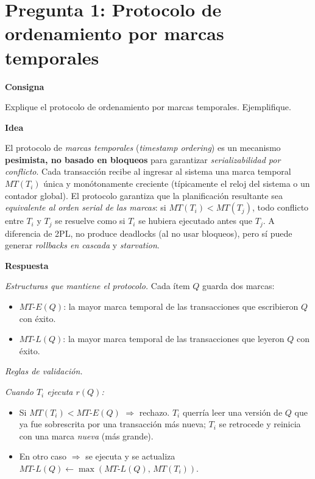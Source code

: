 \documentclass[11pt,a4paper]{article}
\newcommand{\itemcabecera}[1]{\noindent\textbf{#1}\par\medskip}
\newcommand{\bloqueConsigna}{\itemcabecera{Consigna}}
\newcommand{\bloqueIdea}{\itemcabecera{Idea}}
\newcommand{\bloqueRespuesta}{\itemcabecera{Respuesta}}
\begin{document}
\section{Pregunta 1: Protocolo de ordenamiento por marcas temporales}

\bloqueConsigna

Explique el protocolo de ordenamiento por marcas temporales. Ejemplifique.

\bloqueIdea

El protocolo de \emph{marcas temporales} (\emph{timestamp ordering}) es un mecanismo \textbf{pesimista, no basado en bloqueos} para garantizar \emph{serializabilidad por conflicto}. Cada transacción recibe al ingresar al sistema una marca temporal $MT(T_i)$ única y monótonamente creciente (típicamente el reloj del sistema o un contador global). El protocolo garantiza que la planificación resultante sea \emph{equivalente al orden serial de las marcas}: si $MT(T_i) < MT(T_j)$, todo conflicto entre $T_i$ y $T_j$ se resuelve como si $T_i$ se hubiera ejecutado antes que $T_j$. A diferencia de 2PL, no produce deadlocks (al no usar bloqueos), pero sí puede generar \emph{rollbacks en cascada} y \emph{starvation}.

\bloqueRespuesta

\textit{Estructuras que mantiene el protocolo.} Cada ítem $Q$ guarda dos marcas:

\begin{itemize}
    \item $MT\text{-}E(Q)$: la mayor marca temporal de las transacciones que escribieron $Q$ con éxito.
    \item $MT\text{-}L(Q)$: la mayor marca temporal de las transacciones que leyeron $Q$ con éxito.
\end{itemize}

\textit{Reglas de validación.}

\textit{Cuando $T_i$ ejecuta $r(Q)$:}
\begin{itemize}
    \item Si $MT(T_i) < MT\text{-}E(Q)$ $\Rightarrow$ rechazo. $T_i$ querría leer una versión de $Q$ que ya fue sobrescrita por una transacción más nueva; $T_i$ se retrocede y reinicia con una marca \emph{nueva} (más grande).
    \item En otro caso $\Rightarrow$ se ejecuta y se actualiza $MT\text{-}L(Q) \gets \max(MT\text{-}L(Q),\,MT(T_i))$.
\end{itemize}
\end{document}
